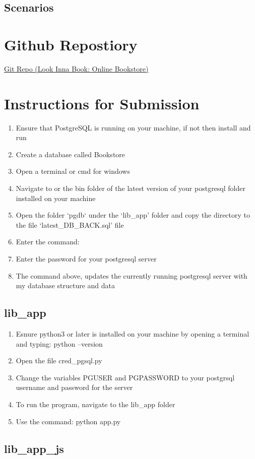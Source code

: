 \documentclass[a4 paper]{article}
\begin{document}
\subsection{Scenarios}
\section{Github Repostiory}
\href{https://github.com/WalterMitty2112/Online-Bookstore-Webapp}{Git Repo (Look Inna Book: Online Bookstore)}
\section{Instructions for Submission}
\begin{enumerate}
\item Ensure that PostgreSQL is running on your machine, if not then install and run 
\item Create a database called Bookstore
\item Open a terminal or cmd for windows
\item Navigate to  or the bin folder of the latest version of your postgresql folder installed on your machine
\item Open the folder `pgdb` under the `lib\_app' folder and copy the directory to the file `latest\_DB\_BACK.sql' file
\item Enter the command: \\
\item Enter the password for your postgresql server
\item The command above, updates the currently running postgresql server with my database structure and data
\end{enumerate}
\subsection{lib\_app}
\begin{enumerate}
\item Esnure python3 or later is installed on your machine by opening a terminal and typing: python --version
\item Open the file cred\_pgsql.py
\item Change the variables PGUSER and PGPASSWORD to your postgrsql username and password for the server
\item To run the program, navigate to the lib\_app folder
\item Use the command: python app.py
\end{enumerate}
\subsection{lib\_app\_js}
\end{document}
